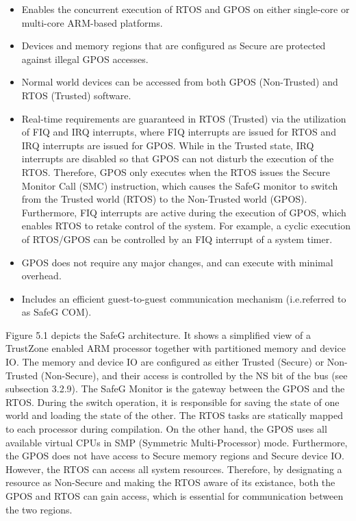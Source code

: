 \begin{itemize}
\item Enables the concurrent execution of RTOS and GPOS on either single-core or multi-core ARM-based platforms.

\item Devices and memory regions that are configured as Secure are protected against illegal GPOS accesses.

\item Normal world devices can be accessed from both GPOS (Non-Trusted) and RTOS (Trusted) software.

\item Real-time requirements are guaranteed in RTOS (Trusted) via the utilization of FIQ and IRQ interrupts, where FIQ interrupts are issued for RTOS and IRQ interrupts are issued for GPOS. While in the Trusted state, IRQ interrupts are disabled so that GPOS can not disturb the execution of the RTOS. Therefore, GPOS only executes when the RTOS issues the Secure Monitor Call (SMC) instruction, which causes the SafeG monitor to switch from the Trusted world (RTOS) to the Non-Trusted world (GPOS). Furthermore, FIQ interrupts are active during the execution of GPOS, which enables RTOS to retake control of the system. For example, a cyclic execution of RTOS/GPOS can be controlled by an FIQ interrupt of a system timer.

\item GPOS does not require any major changes, and can execute with minimal overhead.

\item Includes an efficient guest-to-guest communication mechanism (i.e.referred to as SafeG COM).
\end{itemize}

Figure 5.1 depicts the SafeG architecture. It shows a simplified view of a TrustZone enabled ARM processor together with partitioned memory and device IO. The memory and device IO are configured as either Trusted (Secure) or Non-Trusted (Non-Secure), and their access is controlled by the NS bit of the bus (see subsection 3.2.9). The SafeG Monitor is the gateway between the GPOS and the RTOS. During the switch operation, it is responsible for saving the state of one world and loading the state of the other. The RTOS tasks are statically mapped to each processor during compilation. On the other hand, the GPOS uses all available virtual CPUs in SMP (Symmetric Multi-Processor) mode. Furthermore, the GPOS does not have access to Secure memory regions and Secure device IO. However, the RTOS can access all system resources. Therefore, by designating a resource as Non-Secure and making the RTOS aware of its existance, both the GPOS and RTOS can gain access, which is essential for communication between the two regions.

